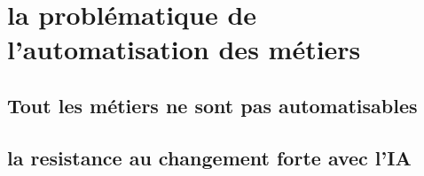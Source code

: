 



\section{la problématique de l'automatisation des métiers}

\subsection{Tout les métiers ne sont pas automatisables}
\subsection{la resistance au changement forte avec l'IA}
